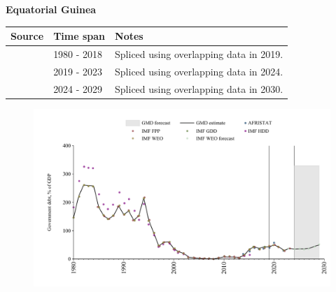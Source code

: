 \documentclass[12pt,a4paper,landscape]{article}
\begin{document}
\begin{adjustbox}{max totalsize={\paperwidth}{\paperheight},center}
\begin{minipage}[t][\textheight][t]{\textwidth}
\vspace*{0.5cm}
{}
\begin{center}
{\Large\bfseries Equatorial Guinea}
\end{center}
\vspace{0.5cm}
\begin{table}[H]
\centering
\small
\begin{tabular}{|l|l|l|}
\hline
\textbf{Source} & \textbf{Time span} & \textbf{Notes} \\
\hline
\rowcolor{white}\cite{IMF_GDD}& 1980 - 2018 &Spliced using overlapping data in 2019.\\
\rowcolor{lightgray}\cite{IMF_FPP}& 2019 - 2023 &Spliced using overlapping data in 2024.\\
\rowcolor{white}\cite{IMF_WEO_forecast}& 2024 - 2029 &Spliced using overlapping data in 2030.\\
\hline
\end{tabular}
\end{table}
\begin{figure}[H]
\centering
\includegraphics[width=\textwidth,height=0.6\textheight,keepaspectratio]{graphs/GNQ_govdebt_GDP.pdf}
\end{figure}
\end{minipage}
\end{adjustbox}
\end{document}
